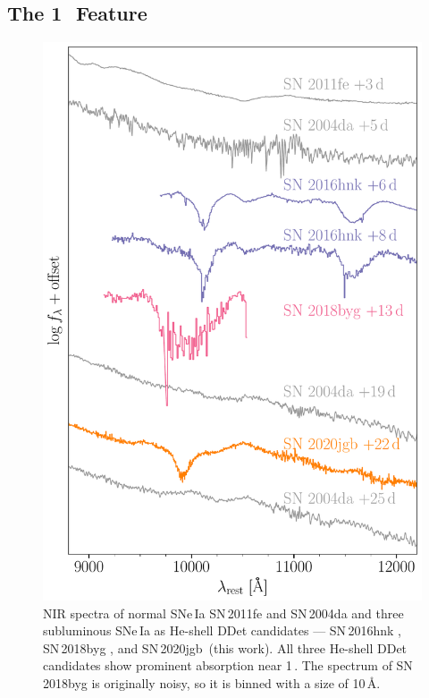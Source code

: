 \documentclass[twocolumn]{aastex631}
\newcommand{\sn}{SN\,2020jgb}
\begin{document}
\subsection{The 1\,\micron\ Feature} \label{sec:1um}
\begin{figure}
    \centering
    \includegraphics[width=\linewidth]{NIR_spec_comp.pdf}
    \caption{NIR spectra of normal SNe\,Ia SN\,2011fe \citep{Mazzali_2014} and SN\,2004da \citep{Marion2009_NIR} and three subluminous SNe\,Ia  as He-shell DDet candidates --- SN\,2016hnk \citep{galbany_16hnk_2019}, SN\,2018byg \citep{de_18byg_2019}, and \sn\ (this work). All three He-shell DDet candidates show prominent absorption near 1\,\micron. The spectrum of SN\,2018byg is originally noisy, so it is binned with a size of 10\,\AA.}
    \label{fig:NIR_comp}
\end{figure}
\end{document}
